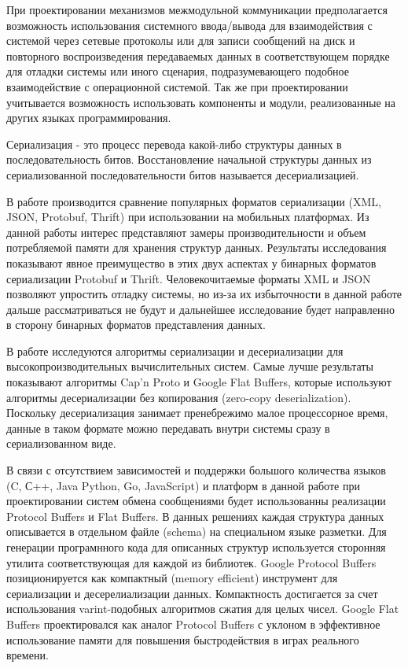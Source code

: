 При проектировании механизмов межмодульной коммуникации предполагается возможность использования системного ввода/вывода для взаимодействия с системой через сетевые протоколы или для записи сообщений на диск и повторного воспроизведения передаваемых данных в соответствующем порядке для отладки системы или иного сценария, подразумевающего подобное взаимодействие с операционной системой. Так же при проектировании учитывается возможность использовать компоненты и модули, реализованные на других языках программирования.

Сериализация - это процесс перевода какой-либо структуры данных в последовательность битов. Восстановление начальной структуры данных из сериализованной последовательности битов называется десериализацией.

В работе \cite{sumaray2012comparison} производится сравнение популярных форматов сериализации (XML, JSON, Protobuf, Thrift) при использовании на мобильных платформах. Из данной работы интерес представляют замеры производительности и объем потребляемой памяти для хранения структур данных. Результаты исследования показывают явное преимущество в этих двух аспектах у бинарных форматов сериализации Protobuf и Thrift. Человекочитаемые форматы XML и JSON позволяют упростить отладку системы, но из-за их избыточности в данной работе дальше рассматриваться не будут и дальнейшее исследование будет направленно в сторону бинарных форматов представления данных.

В работе \cite{zaluzhnyi2016serialization} исследуются алгоритмы сериализации и десериализации для высокопроизводительных вычислительных систем. Самые лучше результаты показывают алгоритмы Cap'n Proto и Google Flat Buffers, которые используют алгоритмы десериализации без копирования (zero-copy deserialization). Поскольку десериализация занимает пренебрежимо малое процессорное время, данные в таком формате можно передавать внутри системы сразу в сериализованном виде.

В связи с отсутствием зависимостей и поддержки большого количества языков (C, С++, Java Python, Go, JavaScript) и платформ  в данной работе при проектировании систем обмена сообщениями будет использованны реализации Protocol Buffers и Flat Buffers. В данных решениях каждая структура данных описывается в отдельном файле (schema) на специальном языке разметки. Для генерации програмнного кода для описанных структур используется сторонняя утилита соответствующая для каждой из библиотек. Google Protocol Buffers позиционируется как компактный (memory efficient) инструмент для сериализации и десерелиализации данных. Компактность достигается за счет использования varint-подобных алгоритмов сжатия для целых чисел. Google Flat Buffers проектировался как аналог Protocol Buffers с уклоном в эффективное использование памяти для повышения быстродействия в играх реального времени. 

